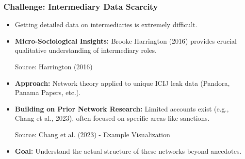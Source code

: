 \documentclass{beamer}
\begin{document}
\begin{frame}
    \frametitle{Challenge: Intermediary Data Scarcity}

    \begin{itemize}
        \item Getting detailed data on intermediaries is extremely difficult.
        \item \textbf{Micro-Sociological Insights:} Brooke Harrington (2016) provides crucial qualitative understanding of intermediary roles.
            \begin{center}
                \scriptsize{Source: Harrington (2016)}
            \end{center}
        \item \textbf{Approach:} Network theory applied to unique ICIJ leak data (Pandora, Panama Papers, etc.).
        \item \textbf{Building on Prior Network Research:} Limited accounts exist (e.g., Chang et al., 2023), often focused on specific areas like sanctions.
            \begin{center}
                \scriptsize{Source: Chang et al. (2023) - Example Visualization}
            \end{center}
        \item \textbf{Goal:} Understand the actual structure of these networks beyond anecdotes.
    \end{itemize}
\end{frame}
\end{document}
